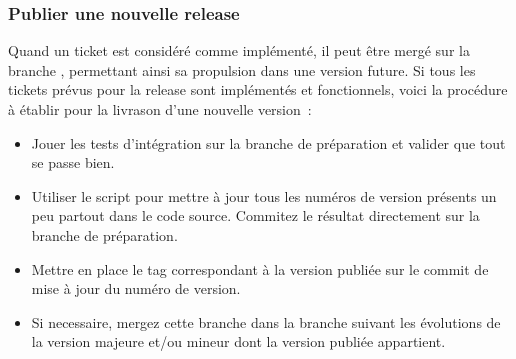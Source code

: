 \subsubsection{Publier une nouvelle release}

Quand un ticket est considéré comme implémenté, il peut être mergé sur la branche , permettant ainsi sa propulsion dans une version future.
Si tous les tickets prévus pour la release sont implémentés et fonctionnels, voici la procédure à établir pour la livrason d'une nouvelle version~:

\begin{itemize}
	\item Jouer les tests d'intégration sur la branche de préparation et valider que tout se passe bien.
	\item Utiliser le script  pour mettre à jour tous les numéros de version présents un peu partout dans le code source. Commitez le résultat directement sur la branche de préparation.
	\item Mettre en place le tag correspondant à la version publiée sur le commit de mise à jour du numéro de version.
	\item Si necessaire, mergez cette branche dans la branche suivant les évolutions de la version majeure et/ou mineur dont la version publiée appartient.
\end{itemize}
